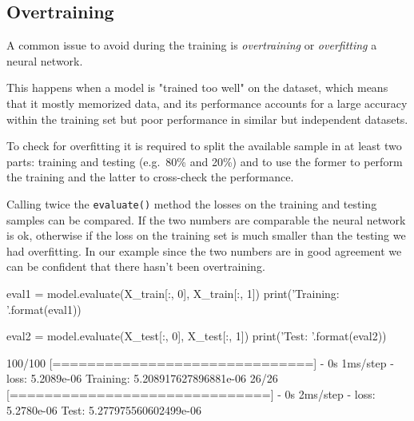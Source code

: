 \subsection{Overtraining}
\label{sec:overtraining}
A common issue to avoid during the training is \emph{overtraining} or \emph{overfitting} a neural network. 

This happens when a model is "trained too well" on the dataset, which means that it mostly memorized data, and its performance accounts for a large accuracy within the training set but poor performance in similar but independent datasets. 

To check for overfitting it is required to split the available sample in at least two parts: training and testing (e.g.~80\% and 20\%) and to use the former to perform the training and the latter to cross-check the performance.


Calling twice the \texttt{evaluate()} method the losses on the training and testing samples can be compared. If the two numbers are comparable the neural network is ok, otherwise if the loss on the training set is much smaller than the testing we had overfitting.
In our example since the two numbers are in good agreement we can be confident that there hasn't been overtraining.

\begin{ipython}
eval1 = model.evaluate(X_train[:, 0], X_train[:, 1])
print('Training: {}'.format(eval1))

eval2 = model.evaluate(X_test[:, 0], X_test[:, 1])
print('Test: {}'.format(eval2))
\end{ipython}
\begin{ioutput}
100/100 [==============================] - 0s 1ms/step - loss: 5.2089e-06
Training: 5.208917627896881e-06
26/26 [==============================] - 0s 2ms/step - loss: 5.2780e-06
Test: 5.277975560602499e-06
\end{ioutput}

